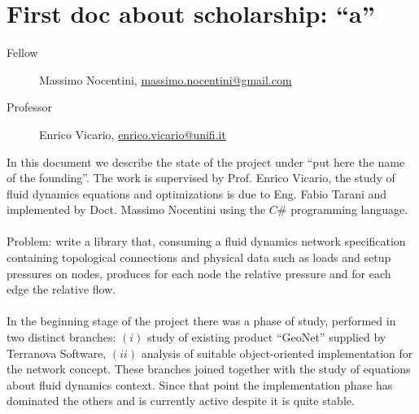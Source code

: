 \documentclass[twoside,openright,titlepage,fleqn,
headinclude,11pt,a4paper,BCOR5mm,footinclude ]{scrbook}
\begin{document}
\frenchspacing
\raggedbottom
{}
\pagestyle{plain}
%
\pagestyle{scrheadings}

\lstset{
	language = java
	, numbers = left 
	, basicstyle=\sffamily%
	, tabsize=2
	, captionpos=b
	, breaklines=true
	, showspaces=false
	, showstringspaces=false
}

\chapter*{First doc about scholarship: ``a'' }
\begin{description}
\item[Fellow] Massimo Nocentini, \url{massimo.nocentini@gmail.com}
\item[Professor] Enrico Vicario, \url{enrico.vicario@unifi.it}
\end{description}

In this document we describe the state of the project under ``put here the name
of the founding''. The work is supervised by Prof. Enrico Vicario, the study of
fluid dynamics equations and optimizations is due to Eng. Fabio Tarani and
implemented by Doct. Massimo Nocentini using the $C\#$ programming language.
\\\\
Problem: write a library that, consuming a fluid dynamics network specification 
containing topological connections and physical data such as loads and
setup pressures on nodes, produces for each node the relative pressure and for
each edge the relative flow.
\\\\
In the beginning stage of the project there was a phase of study, performed in
two distinct branches: $(i)$ study of existing product ``GeoNet'' supplied by
Terranova Software, $(ii)$ analysis of suitable object-oriented implementation
for the network concept. These branches joined together with the study of equations
about fluid dynamics context. Since that point the implementation phase has 
dominated the others and is currently active despite it is quite stable.
\end{document}
